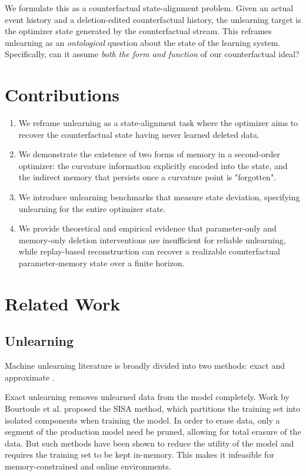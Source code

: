 \documentclass{ssl}
\begin{document}
We formulate this as a counterfactual state-alignment problem. Given an actual event history and a deletion-edited counterfactual history, the unlearning target is the optimizer state generated by the counterfactual stream. This reframes unlearning as an \textit{ontological} question about the state of the learning system. Specifically, can it assume \textit{both the form and function} of our counterfactual ideal?

\section{Contributions}
\begin{enumerate}
    \item We reframe unlearning as a state-alignment task where the optimizer aims to recover the counterfactual state having never learned deleted data.
    \item We demonstrate the existence of two forms of memory in a second-order optimizer: the curvature information explicitly encoded into the state, and the indirect memory that persists once a curvature point is "forgotten".
    \item We introduce unlearning benchmarks that measure state deviation, specifying unlearning for the entire optimizer state.
    \item We provide theoretical and empirical evidence that parameter-only and memory-only deletion interventions are insufficient for reliable unlearning, while replay-based reconstruction can recover a realizable counterfactual parameter-memory state over a finite horizon.
\end{enumerate}

\section{Related Work}
\subsection{Unlearning}
Machine unlearning literature is broadly divided into two methods: exact and approximate \cite{xu_machine_2024}.

Exact unlearning removes unlearned data from the model completely. Work by Bourtoule et al. \cite{bourtoule_machine_2020} proposed the SISA method, which partitions the training set into isolated components when training the model. In order to erase data, only a segment of the production model need be pruned, allowing for total erasure of the data. But such methods have been shown to reduce the utility of the model and requires the training set to be kept in-memory. This makes it infeasible for memory-constrained and online environments.
\end{document}

